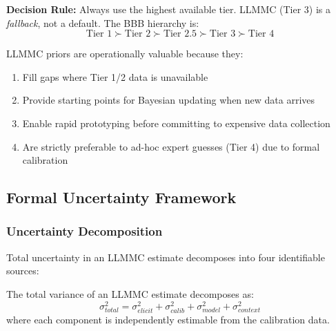 \textbf{Decision Rule:} Always use the highest available tier. LLMMC (Tier 3) is a
\textit{fallback}, not a default. The BBB hierarchy is:
\begin{equation}
    \text{Tier 1} \succ \text{Tier 2} \succ \text{Tier 2.5} \succ \text{Tier 3} \succ \text{Tier 4}
\end{equation}

LLMMC priors are operationally valuable because they:
\begin{enumerate}[nosep]
    \item Fill gaps where Tier 1/2 data is unavailable
    \item Provide starting points for Bayesian updating when new data arrives
    \item Enable rapid prototyping before committing to expensive data collection
    \item Are strictly preferable to ad-hoc expert guesses (Tier 4) due to formal calibration
\end{enumerate}


\subsection{Formal Uncertainty Framework}
\label{sec:AN-uncertainty}

\subsubsection{Uncertainty Decomposition}

Total uncertainty in an LLMMC estimate decomposes into four identifiable sources:

\begin{axiom}
\label{ax:AN-A5}
The total variance of an LLMMC estimate decomposes as:
\begin{equation}
    \sigma^2_{total} = \sigma^2_{elicit} + \sigma^2_{calib} + \sigma^2_{model} + \sigma^2_{context}
    \label{eq:uncertainty-decomp}
\end{equation}
where each component is independently estimable from the calibration data.
\end{axiom}

